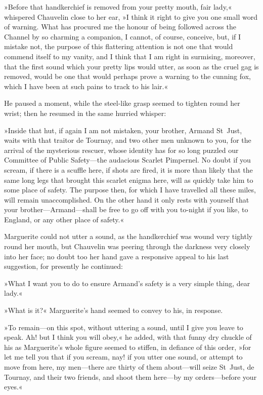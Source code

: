 »Before that handkerchief is removed from your pretty mouth, fair lady,« whispered Chauvelin close to her ear, »I think it right to give you one small word of warning. What has procured me the honour of being followed across the Channel by so charming a companion, I cannot, of course, conceive, but, if I mistake not, the purpose of this flattering attention is not one that would commend itself to my vanity, and I think that I am right in surmising, moreover, that the first sound which your pretty lips would utter, as soon as the cruel gag is removed, would be one that would perhaps prove a warning to the cunning fox, which I have been at such pains to track to his lair.«

He paused a moment, while the steel-like grasp seemed to tighten round her wrist; then he resumed in the same hurried whisper:\longdash


»Inside that hut, if again I am not mistaken, your brother, Armand St~Just, waits with that traitor de Tournay, and two other men unknown to you, for the arrival of the mysterious rescuer, whose identity has for so long puzzled our Committee of Public Safety\allowbreak---\allowbreak the audacious Scarlet Pimpernel. No doubt if you scream, if there is a scuffle here, if shots are fired, it is more than likely that the same long legs that brought this scarlet enigma here, will as quickly take him to some place of safety. The purpose then, for which I have travelled all these miles, will remain unaccomplished. On the other hand it only rests with yourself that your brother\allowbreak---\allowbreak Armand\allowbreak---\allowbreak shall be free to go off with you to-night if you like, to England, or any other place of safety.«

Marguerite could not utter a sound, as the handkerchief was wound very tightly round her mouth, but Chauvelin was peering through the darkness very closely into her face; no doubt too her hand gave a responsive appeal to his last suggestion, for presently he continued:\longdash


»What I want you to do to ensure Armand's safety is a very simple thing, dear lady.«

»What is it?« Marguerite's hand seemed to convey to his, in response.

»To remain\allowbreak---\allowbreak on this spot, without uttering a sound, until I give you leave to speak. Ah! but I think you will obey,« he added, with that funny dry chuckle of his as Marguerite's whole figure seemed to stiffen, in defiance of this order, »for let me tell you that if you scream, nay! if you utter one sound, or attempt to move from here, my men\allowbreak---\allowbreak there are thirty of them about\allowbreak---\allowbreak will seize St~Just, de Tournay, and their two friends, and shoot them here\allowbreak---\allowbreak by my orders\allowbreak---\allowbreak before your eyes.«

